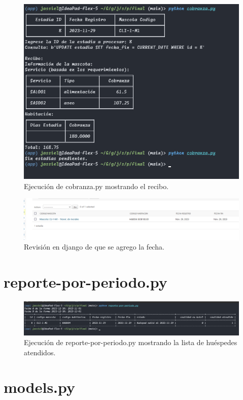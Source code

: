 \documentclass[
  12pt,
  hidelinks,
  a4paper,
  headings=standardclasses,
  headings=big,
  spanish
]{scrartcl}
\begin{document}
\begin{figure}[H]
  \centering
  \includegraphics[width=\textwidth]{cobranza-fin.png}
  \caption{Ejecución de cobranza.py mostrando el recibo.}
\end{figure}

\begin{figure}[H]
  \centering
  \includegraphics[width=\textwidth]{estadia-fin.png}
  \caption{Revisión en django de que se agrego la fecha.}
\end{figure}

\pagebreak
\section{reporte-por-periodo.py}

\begin{figure}[H]
  \centering
  \includegraphics[width=\textwidth]{reporte-1.png}
  \caption{Ejecución de reporte-por-periodo.py mostrando la lista de huéspedes atendidos.}
\end{figure}

\pagebreak
\section{models.py}


\end{document}
